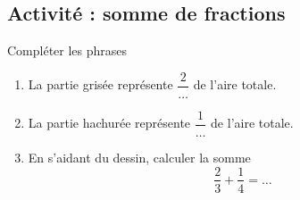 
\subsection*{Activité : somme de fractions}

Compléter les phrases
\begin{center}
   
\end{center}
\begin{enumerate}
    \item
        La partie grisée représente \( \dfrac{ 2 }{ \ldots }\) de l'aire totale.
    \item
        La partie hachurée représente \( \dfrac{ 1 }{ \ldots }\) de l'aire totale.
    \item
        En s'aidant du dessin, calculer la somme
        \begin{equation}
            \frac{ 2 }{ 3 }+\frac{1}{ 4 }=\ldots
        \end{equation}
\end{enumerate}

